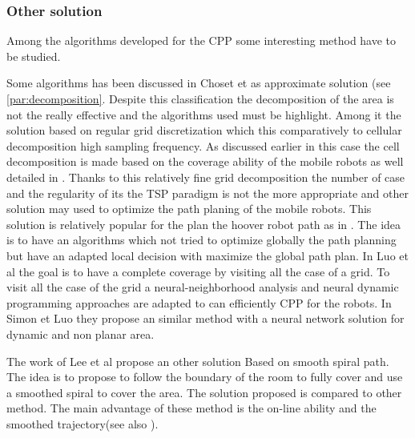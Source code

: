 %		
%		
		
		\subsubsection{Other solution}
		
		Among the algorithms developed for the CPP some interesting method have to be studied.
		
		Some algorithms has been discussed in Choset et \cite{214*choset2001} as approximate solution (see \ref{par:decomposition}. Despite this classification the decomposition of the area is not the really effective and the algorithms used must be highlight. Among it the solution based on regular grid discretization which this  comparatively to cellular decomposition high sampling frequency. As discussed earlier in this case the cell decomposition is made based on the coverage ability of the  mobile robots as  well detailed in \citep{218*meiting2007}.
		Thanks to this relatively fine grid decomposition the number of case and the regularity of its the TSP paradigm is not the more appropriate and other solution may used to optimize the path planing of the mobile robots.
		This solution is relatively popular for the plan the hoover robot path as in  \citep{216*luo2002,196*yang2004,215*lee2010,218*meiting2007}.
		The idea is to have an algorithms which not tried to optimize globally the path planning but have an adapted local decision with maximize the global path plan. In Luo et al \citep{216*luo2002} the goal is to have a complete coverage by visiting all the case of a grid. To visit all the case of the grid a neural-neighborhood analysis and neural dynamic programming approaches are adapted to can efficiently CPP for the robots. In Simon et Luo \citep{196*yang2004} they propose an similar method with a neural network solution for dynamic and non planar area.
		
		The work of Lee et al \cite{215*lee2010} propose an other solution Based on smooth spiral path. The idea is to propose to follow the boundary of the room to fully cover and use a smoothed spiral to cover the area. The solution proposed is compared to other method. The main advantage of these method is the on-line ability and the smoothed trajectory(see also \citep{195*choi2009}).
		
